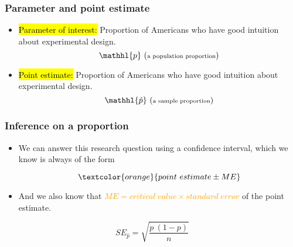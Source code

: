 \documentclass[slidestop,compress,mathserif]{beamer}
\begin{document}

\begin{frame}
\frametitle{Parameter and point estimate}


\pause

\begin{itemize}

\item \hl{Parameter of interest:} Proportion of  Americans who have good intuition about experimental design.
\[ \mathhl{p}~\scriptsize{(\text{a population proportion})} \]

\pause

\item \hl{Point estimate:} Proportion of  Americans who have good intuition about experimental design.
\[ \mathhl{\hat{p}}~\scriptsize{(\text{a sample proportion})} \]

\end{itemize}

\end{frame}


\begin{frame}
\frametitle{Inference on a proportion}


\pause

\begin{itemize}

\item We can answer this research question using a confidence interval, which we know is always of the form

\[ \textcolor{orange}{point~estimate \pm ME} \]

\pause

\item And we also know that \textcolor{orange}{$ME = critical~value \times standard~error$} of the point estimate.

\end{itemize}

\pause

{
\[ SE_{\hat{p}} =  \sqrt{\frac{p~(1-p)}{n}}  \]
}


\end{frame}
\end{document}
